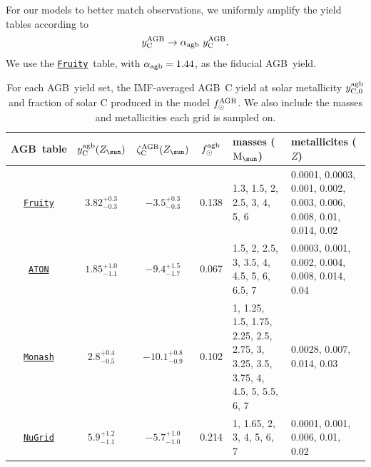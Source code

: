\documentclass[fleqn,
usenatbib]{mnras}
\newcommand{\fruity}{\texttt{\hyperlink{fruity}{Fruity}}}
\newcommand{\nugrid}{\texttt{\hyperlink{nugrid}{NuGrid}}}
\newcommand{\monash}{\texttt{\hyperlink{monash}{Monash}}}
\newcommand{\aton}{\texttt{\hyperlink{aton}{ATON}}}
\newcommand{\cfactor}{1.44}
\newcommand{\agb}{AGB}
\newcommand{\Ycagb}{{y_{\rm C}^{\rm AGB}}}
\newcommand{\zagb}{\zeta_{\rm C}^{\rm AGB}}
\newcommand{\Mo}{ {\rm M}_{\sun}}
\newcommand{\Zo}{ Z_{\sun}}
\begin{document}
For our models to better match observations, we uniformly amplify the yield tables according to
\begin{equation} \label{eq:alpha}
        \Ycagb \rightarrow \alpha_{\rm agb}\ \Ycagb.
\end{equation}
We use the \fruity\ table, with $\alpha_{\rm agb}=\cfactor$, as the fiducial \agb\ yield.


\begin{table}
	\centering
    \caption[]{For each \agb\ yield set, the IMF-averaged \agb\ C yield at solar metallicity $y_{\rm C, 0}^{\rm agb}$ and fraction of solar C produced in the model $f_\odot^{\rm AGB}$.  We also include the masses and metallicities each grid is sampled on.
    }

	\label{tab:agb}
    \begin{tabular}{c  cc  c p{5cm} p{5cm}} %
		\hline 
        \agb\ table 
                & $y_{\rm C}^{\rm agb}(\Zo)$ %
                & $\zagb(\Zo)$ %
                &  $f_\odot^{\rm agb}$
                & masses ($\Mo$) & metallicites ($Z$)\\
        \hline
        \fruity 
                &  $3.82^{+0.3}_{-0.3}$ %
                & $-3.5^{+0.3}_{-0.3}$ %
                & 0.138
                & 1.3, 1.5, 2, 2.5, 3, 4, 5, 6
                & 0.0001, 0.0003, 0.001, 0.002, 0.003, 0.006, 0.008, 0.01, 0.014, 0.02
                \\
        \aton 
                & $1.85^{+1.0}_{-1.1}$ %
                & $-9.4^{+1.5}_{-1.7}$ %
                & 0.067
                & 1.5, 2, 2.5, 3, 3.5, 4, 4.5, 5, 6, 6.5, 7
                & 0.0003, 0.001, 0.002, 0.004, 0.008, 0.014, 0.04
                \\
        \monash 
                & $2.8^{+0.4}_{-0.5}$ %
                & $-10.1^{+0.8}_{-0.9}$%
                & 0.102
                & 1, 1.25, 1.5, 1.75, 2.25, 2.5, 2.75, 3, 3.25, 3.5, 3.75, 4, 4.5, 5, 5.5, 6, 7 
                & 0.0028, 0.007, 0.014, 0.03
                \\
        \nugrid 
                & $5.9^{+1.2}_{-1.1}$ %
                & $-5.7^{+1.0}_{-1.0}$ %
                & 0.214
                & 1, 1.65, 2, 3, 4, 5, 6, 7
                &  0.0001, 0.001, 0.006, 0.01, 0.02
                \\
		\hline
	\end{tabular}
\end{table}
\end{document}
